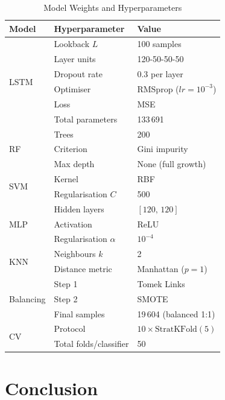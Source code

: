 \documentclass[journal]{IEEEtran}
\begin{document}
\begin{table}[!t]
\caption{Model Weights and Hyperparameters}
\label{tab:params}
\centering
\renewcommand{\arraystretch}{1.1}
\begin{tabular}{lll}
\toprule
\textbf{Model} & \textbf{Hyperparameter} & \textbf{Value} \\
\midrule
\multirow{6}{*}{LSTM}
  & Lookback $L$            & 100 samples \\
  & Layer units             & 120-50-50-50 \\
  & Dropout rate            & 0.3 per layer \\
  & Optimiser               & RMSprop ($lr=10^{-3}$) \\
  & Loss                    & MSE \\
  & Total parameters        & 133\,691 \\
\midrule
\multirow{3}{*}{RF}
  & Trees                   & 200 \\
  & Criterion               & Gini impurity \\
  & Max depth               & None (full growth) \\
\midrule
\multirow{2}{*}{SVM}
  & Kernel                  & RBF \\
  & Regularisation $C$      & 500 \\
\midrule
\multirow{3}{*}{MLP}
  & Hidden layers           & $[120,\,120]$ \\
  & Activation              & ReLU \\
  & Regularisation $\alpha$ & $10^{-4}$ \\
\midrule
\multirow{2}{*}{KNN}
  & Neighbours $k$          & 2 \\
  & Distance metric         & Manhattan ($p=1$) \\
\midrule
\multirow{3}{*}{Balancing}
  & Step 1                  & Tomek Links \\
  & Step 2                  & SMOTE \\
  & Final samples           & 19\,604 (balanced 1:1) \\
\midrule
\multirow{2}{*}{CV}
  & Protocol                & $10\times\text{StratKFold}(5)$ \\
  & Total folds/classifier  & 50 \\
\bottomrule
\end{tabular}
\end{table}

\section{Conclusion}
\label{sec:conclusion}
\end{document}
